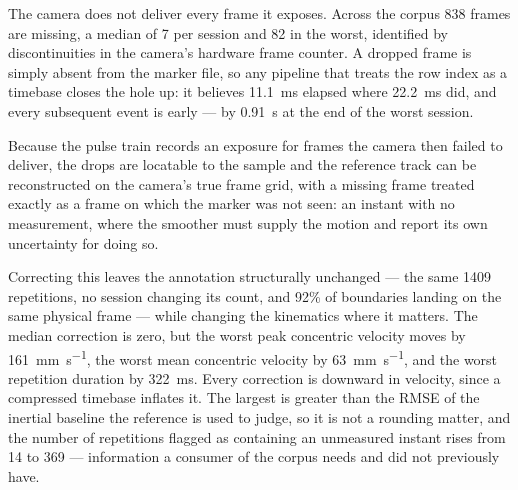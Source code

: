 The camera does not deliver every frame it exposes. Across the corpus 838 frames are
missing, a median of 7 per session and 82 in the worst, identified by discontinuities in
the camera's hardware frame counter. A dropped frame is simply absent from the marker
file, so any pipeline that treats the row index as a timebase closes the hole up: it
believes \SI{11.1}{\milli\second} elapsed where \SI{22.2}{\milli\second} did, and every
subsequent event is early --- by \SI{0.91}{\second} at the end of the worst session.

Because the pulse train records an exposure for frames the camera then failed to deliver,
the drops are locatable to the sample and the reference track can be reconstructed on the
camera's true frame grid, with a missing frame treated exactly as a frame on which the
marker was not seen: an instant with no measurement, where the smoother must supply the
motion and report its own uncertainty for doing so.

Correcting this leaves the annotation structurally unchanged --- the same 1409
repetitions, no session changing its count, and 92\% of boundaries landing on the same
physical frame --- while changing the kinematics where it matters. The median correction
is zero, but the worst peak concentric velocity moves by
\SI{161}{\milli\metre\per\second}, the worst mean concentric velocity by
\SI{63}{\milli\metre\per\second}, and the worst repetition duration by
\SI{322}{\milli\second}. Every correction is downward in velocity, since a compressed
timebase inflates it. The largest is greater than the RMSE of the inertial baseline the
reference is used to judge, so it is not a rounding matter, and the number of repetitions
flagged as containing an unmeasured instant rises from 14 to 369 --- information a
consumer of the corpus needs and did not previously have.
